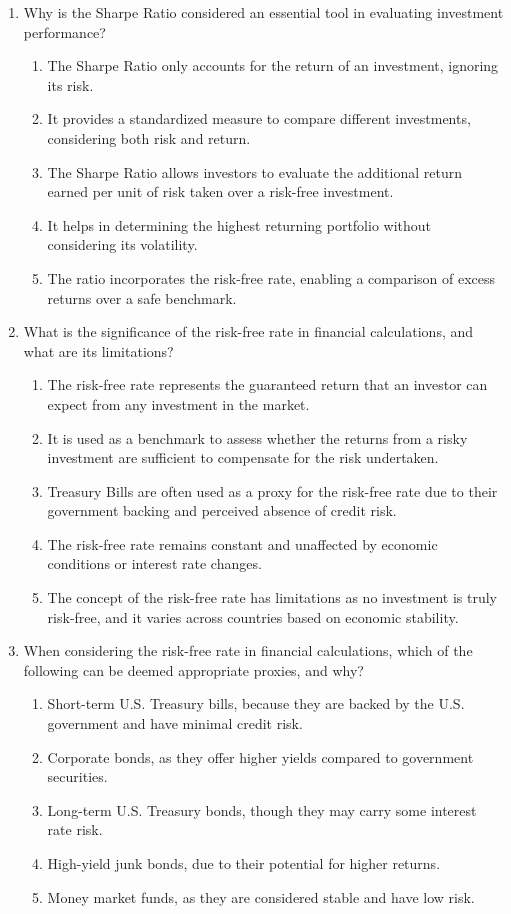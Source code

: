 \documentclass{article}
\begin{document}
\begin{enumerate}
    \item Why is the Sharpe Ratio considered an essential tool in evaluating investment performance?
    \begin{enumerate}
        \item The Sharpe Ratio only accounts for the return of an investment, ignoring its risk.
        \item It provides a standardized measure to compare different investments, considering both risk and return.
        \item The Sharpe Ratio allows investors to evaluate the additional return earned per unit of risk taken over a risk-free investment.
        \item It helps in determining the highest returning portfolio without considering its volatility.
        \item The ratio incorporates the risk-free rate, enabling a comparison of excess returns over a safe benchmark.
    \end{enumerate}
    
    \item What is the significance of the risk-free rate in financial calculations, and what are its limitations?
    \begin{enumerate}
        \item The risk-free rate represents the guaranteed return that an investor can expect from any investment in the market.
        \item It is used as a benchmark to assess whether the returns from a risky investment are sufficient to compensate for the risk undertaken.
        \item Treasury Bills are often used as a proxy for the risk-free rate due to their government backing and perceived absence of credit risk.
        \item The risk-free rate remains constant and unaffected by economic conditions or interest rate changes.
        \item The concept of the risk-free rate has limitations as no investment is truly risk-free, and it varies across countries based on economic stability.
    \end{enumerate}

    \item When considering the risk-free rate in financial calculations, which of the following can be deemed appropriate proxies, and why?
    \begin{enumerate}
        \item Short-term U.S. Treasury bills, because they are backed by the U.S. government and have minimal credit risk.
        \item Corporate bonds, as they offer higher yields compared to government securities.
        \item Long-term U.S. Treasury bonds, though they may carry some interest rate risk.
        \item High-yield junk bonds, due to their potential for higher returns.
        \item Money market funds, as they are considered stable and have low risk.
    \end{enumerate}


\end{enumerate}
\end{document}

